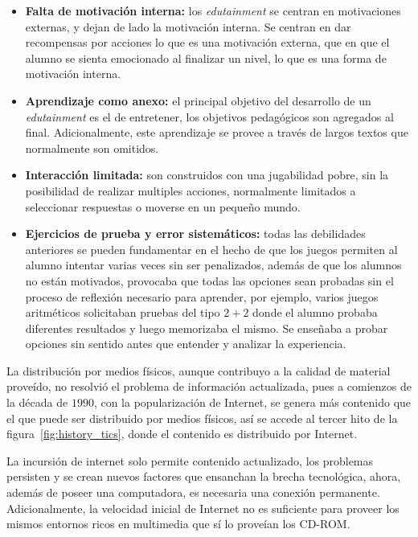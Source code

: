 \begin{itemize}

\item \textbf{Falta de motivación interna:} los \emph{edutainment} se centran en
    motivaciones externas, y dejan de lado la motivación interna. Se centran en
    dar recompensas por acciones lo que es una motivación externa, que en que el
    alumno se sienta emocionado al finalizar un nivel, lo que es una forma de
    motivación interna.

\item \textbf{Aprendizaje como anexo:} el principal objetivo del desarrollo de un
    \emph{edutainment} es el de entretener, los objetivos pedagógicos son
    agregados al final. Adicionalmente, este aprendizaje se provee a través de
    largos textos que normalmente son omitidos.

\item \textbf{Interacción limitada:} son construidos con una jugabilidad pobre,
    sin la posibilidad de realizar multiples acciones, normalmente limitados a
    seleccionar respuestas o moverse en un pequeño mundo. 

\item \textbf{Ejercicios de prueba y error sistemáticos:} todas las debilidades
    anteriores se pueden fundamentar en el hecho de que los juegos permiten al
    alumno intentar varias veces sin ser penalizados, además
    de que los alumnos no están motivados, provocaba que todas las opciones sean
    probadas sin el proceso de reflexión necesario para aprender, por ejemplo,
    varios juegos aritméticos solicitaban pruebas del tipo $2+2$ donde el alumno
    probaba diferentes resultados y luego memorizaba el mismo. Se enseñaba a
    probar opciones sin sentido antes que entender y analizar la experiencia.

\end{itemize}

La distribución por medios físicos, aunque contribuyo a la calidad de material
proveído, no resolvió el problema de información actualizada, pues a comienzos
de la década de $1990$, con la popularización de Internet, se genera más
contenido que el que puede ser distribuido por medios físicos, así se accede al
tercer hito de la figura~\ref{fig:history_tics}, donde el contenido es
distribuido por Internet.

La incursión de internet solo permite contenido actualizado, los problemas
persisten y se crean nuevos factores que ensanchan la brecha tecnológica,
ahora, además de poseer una computadora, es necesaria una conexión permanente.
Adicionalmente, la velocidad inicial de Internet no es suficiente para proveer
los mismos entornos ricos en multimedia que sí lo proveían los
CD-ROM\cite{leinonen:ict}.

